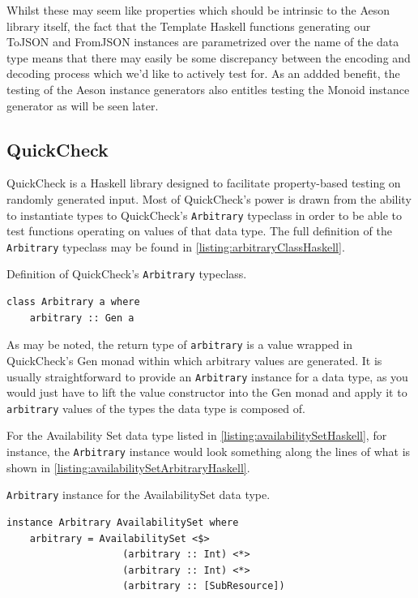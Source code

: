 \documentclass[11pt]{report}
\begin{document}
Whilst these may seem like properties which should be intrinsic to the Aeson
library itself, the fact that the Template Haskell functions generating our
ToJSON and FromJSON instances are parametrized over the name of the data type
means that there may easily be some discrepancy between the encoding and
decoding process which we'd like to actively test for. As an addded benefit,
the testing of the Aeson instance generators also entitles testing the Monoid
instance generator as will be seen later.

\subsection{QuickCheck}

QuickCheck is a Haskell library designed to facilitate property-based testing
on randomly generated input. Most of QuickCheck's power is drawn from the
ability to instantiate types to QuickCheck's \texttt{Arbitrary} typeclass in
order to be able to test functions operating on values of that data type.
The full definition of the \texttt{Arbitrary} typeclass may be found in
\autoref{listing:arbitraryClassHaskell}.

\begin{listing}[H]
\label{listing:arbitraryClassHaskell}
\caption{Definition of QuickCheck's \texttt{Arbitrary} typeclass.}
\begin{verbatim}
class Arbitrary a where
    arbitrary :: Gen a
\end{verbatim}
\end{listing}

As may be noted, the return type of \texttt{arbitrary} is a value wrapped in
QuickCheck's Gen monad within which arbitrary values are generated. It is
usually straightforward to provide an \texttt{Arbitrary} instance for a data
type, as you would just have to lift the value constructor into the Gen monad
and apply it to \texttt{arbitrary} values of the types the data type is
composed of.

For the Availability Set data type listed in
\autoref{listing:availabilitySetHaskell}, for instance, the \texttt{Arbitrary}
instance would look something along the lines of what is shown in
\autoref{listing:availabilitySetArbitraryHaskell}.

\begin{listing}[H]
\label{listing:availabilitySetArbitraryHaskell}
\caption{\texttt{Arbitrary} instance for the AvailabilitySet data type.}
\begin{verbatim}
instance Arbitrary AvailabilitySet where
    arbitrary = AvailabilitySet <$>
                    (arbitrary :: Int) <*>
                    (arbitrary :: Int) <*>
                    (arbitrary :: [SubResource])
\end{verbatim}
\end{listing}
\end{document}

